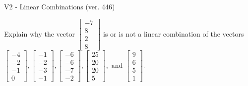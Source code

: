 \begin{exercise}
  \begin{exerciseTitle}V2 - Linear Combinations (ver. 446)\end{exerciseTitle}
  \begin{exerciseStatement}
    Explain why the vector \(\left[\begin{array}{c}
-7 \\
8 \\
2 \\
8
\end{array}\right]\)  is or is not a linear 
	combination of the vectors \(\left[\begin{array}{c}
-4 \\
-2 \\
-1 \\
0
\end{array}\right] , \left[\begin{array}{c}
-1 \\
-2 \\
-3 \\
-1
\end{array}\right] , \left[\begin{array}{c}
-6 \\
-6 \\
-7 \\
-2
\end{array}\right] , \left[\begin{array}{c}
25 \\
20 \\
20 \\
5
\end{array}\right] , \text{ and } \left[\begin{array}{c}
9 \\
6 \\
5 \\
1
\end{array}\right]\).
	



\end{exerciseStatement}
\end{exercise}
